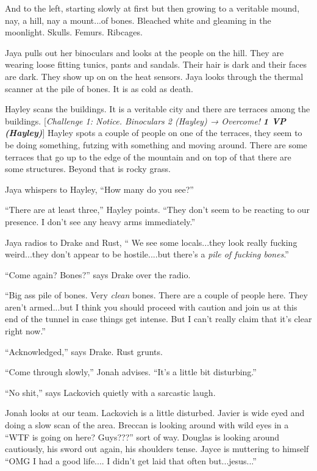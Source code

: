 And to the left, starting slowly at first but then growing to a veritable mound, nay, a hill, nay a mount...of bones.  Bleached white and gleaming in the moonlight.  Skulls.  Femurs.  Ribcages.



Jaya pulls out her binoculars and looks at the people on the hill.  They are wearing loose fitting tunics, pants and sandals.  Their hair is dark and their faces are dark.  They show up on on the heat sensors.  Jaya looks through the thermal scanner at the pile of bones.  It is as cold as death.

Hayley scans the buildings.  It is a veritable city and there are terraces among the buildings.  {[}\textit{Challenge 1: Notice.  Binoculars 2 (Hayley) → Overcome! }\textit{\textbf{1 VP (Hayley)}}{]}  Hayley spots a couple of people on one of the terraces, they seem to be doing something, futzing with something and moving around.  There are some terraces that go up to the edge of the mountain and on top of that there are some structures.  Beyond that is rocky grass.

Jaya whispers to Hayley, ``How many do you see?''

``There are at least three,'' Hayley points.  ``They don't seem to be reacting to our presence.  I don't see any heavy arms immediately.''



Jaya radios to Drake and Rust, `` We see some locals...they look really fucking weird...they don't appear to be hostile....but there's a \textit{pile of fucking bones}.''

``Come again?  Bones?'' says Drake over the radio.

``Big ass pile of bones.  Very \textit{clean }bones. There are a couple of people here.  They aren't armed...but I think you should proceed with caution and join us at this end of the tunnel in case things get intense.  But I can't really claim that it's clear right now.''

``Acknowledged,'' says Drake. Rust grunts.

``Come through slowly,'' Jonah advises.  ``It's a little bit disturbing.''

``No shit,'' says Lackovich quietly with a sarcastic laugh.



Jonah looks at our team.  Lackovich is a little disturbed.  Javier is wide eyed and doing a slow scan of the area.  Breccan is looking around with wild eyes in a ``WTF is going on here?  Guys???'' sort of way.  Douglas is looking around cautiously, his sword out again, his shoulders tense.  Jayce is muttering to himself ``OMG I had a good life.... I didn't get laid that often but...jesus...''



